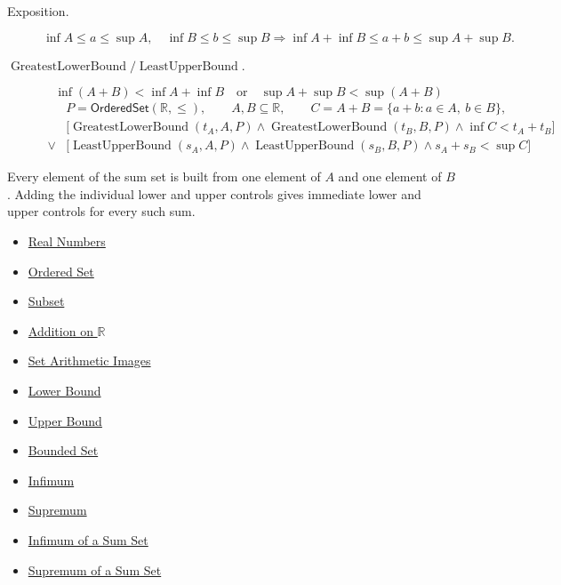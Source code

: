 \begin{remark*}
\begin{description}
  \item[Exposition.]
\[
\inf A\le a\le \sup A,\quad \inf B\le b\le \sup B
\Longrightarrow
\inf A+\inf B\le a+b\le \sup A+\sup B.
\]


  \item[\(\operatorname{GreatestLowerBound} / \operatorname{LeastUpperBound}.\)]
  \[
\inf(A+B)<\inf A+\inf B
\quad\text{or}\quad
\sup A+\sup B<\sup(A+B)
\]
\[
\begin{aligned}
&P=\mathsf{OrderedSet}(\mathbb{R},\leq),\qquad
A,B\subseteq\mathbb{R},\qquad C=A+B=\{a+b:a\in A,\ b\in B\},\\
&\bigl[\operatorname{GreatestLowerBound}(t_A,A,P)\land
\operatorname{GreatestLowerBound}(t_B,B,P)\land \inf C<t_A+t_B\bigr]\\
\lor
&\bigl[\operatorname{LeastUpperBound}(s_A,A,P)\land
\operatorname{LeastUpperBound}(s_B,B,P)\land s_A+s_B<\sup C\bigr]
\end{aligned}
\]
\end{description}
\end{remark*}

\begin{remark*}[Interpretation]
Every element of the sum set is built from one element of $A$ and one element of $B$. Adding the individual lower and upper controls gives immediate lower and upper controls for every such sum.
\end{remark*}

\begin{dependencies}
\begin{itemize}
  \item \hyperref[def:reals]{Real Numbers}
  \item \hyperref[def:ordered-set]{Ordered Set}
  \item \hyperref[def:subset]{Subset}
  \item \hyperref[def:addition-on-r]{Addition on $\mathbb{R}$}
  \item \hyperref[def:set-arithmetic-images]{Set Arithmetic Images}
  \item \hyperref[def:real-lower-bound]{Lower Bound}
  \item \hyperref[def:real-upper-bound]{Upper Bound}
  \item \hyperref[def:bounded]{Bounded Set}
  \item \hyperref[def:infimum]{Infimum}
  \item \hyperref[def:supremum]{Supremum}
  \item \hyperref[thm:infimum-sum-set]{Infimum of a Sum Set}
  \item \hyperref[thm:supremum-sum-set]{Supremum of a Sum Set}
\end{itemize}
\end{dependencies}




